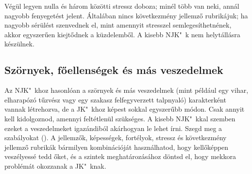 Végül legyen nulla és három közötti stressz doboza; minél több van neki, annál nagyobb fenyegetést jelent. Általában nincs következmény jellemző rubrikájuk; ha nagyobb sérülést szenvednek el, mint amennyit stresszel semlegesíthetnének, akkor egyszerűen kiejtődnek a küzdelemből. A kisebb NJK"~k nem helytállásra készülnek.

\label{Szörnyek, főellenségek és más veszedelmek}
\subsection{Szörnyek, főellenségek és más veszedelmek}

Az NJK"~khoz hasonlóan a szörnyek és más veszedelmek (mint például egy vihar, elharapózó tűzvész vagy egy szakasz felfegyverzett talpnyaló) karakterként vannak létrehozva, de a JK"~khoz képest sokkal egyszerűbb módon. Csak annyit kell kidolgoznod, amennyi feltétlenül szükséges. A kisebb NJK"~kkal szemben ezeket a veszedelmeket igazándiból akárhogyan le lehet írni. Szegd meg a szabályokat (). A jellemzők, képességek, fortélyok, stressz és következmény jellemző rubrikák bármilyen kombinációját használhatod, hogy kellőképpen veszélyessé tedd őket, és a szintek meghatározásához döntsd el, hogy mekkora problémát okozzanak a JK"~knak.
